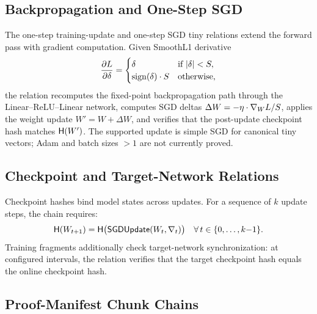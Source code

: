 \subsection{Backpropagation and One-Step SGD}

The one-step training-update and one-step SGD tiny relations extend the
forward pass with gradient computation. Given SmoothL1 derivative
\begin{equation}\label{eq:smoothl1-grad}
  \frac{\partial L}{\partial \delta} =
  \begin{cases}
    \delta & \text{if } |\delta| < S, \\
    \mathrm{sign}(\delta) \cdot S & \text{otherwise,}
  \end{cases}
\end{equation}
the relation recomputes the fixed-point backpropagation path through the
Linear--ReLU--Linear network, computes SGD deltas
$\Delta W = -\eta \cdot \nabla_W L / S$, applies the weight update
$W' = W + \Delta W$, and verifies that the post-update checkpoint hash matches
$\mathsf{H}(W')$. The supported update is simple SGD for canonical tiny vectors;
Adam and batch sizes $>1$ are not currently proved.

\subsection{Checkpoint and Target-Network Relations}

Checkpoint hashes bind model states across updates. For a sequence of $k$
update steps, the chain requires:
\begin{equation}\label{eq:checkpoint-chain}
  \mathsf{H}(W_{t+1}) = \mathsf{H}\bigl(\mathsf{SGDUpdate}(W_t, \nabla_t)\bigr)
  \quad \forall\, t \in \{0, \ldots, k{-}1\}.
\end{equation}
Training fragments additionally check target-network synchronization: at
configured intervals, the relation verifies that the target checkpoint hash
equals the online checkpoint hash.

\subsection{Proof-Manifest Chunk Chains}

